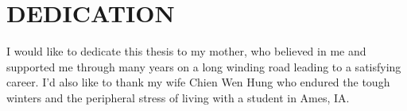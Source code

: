 \chapter*{DEDICATION}

I would like to dedicate this thesis to my mother, who believed in me and supported me through many years on a long winding road leading to a satisfying career.  I'd also like to thank my wife Chien Wen Hung who endured the tough winters and the peripheral stress of living with a student in Ames, IA.

